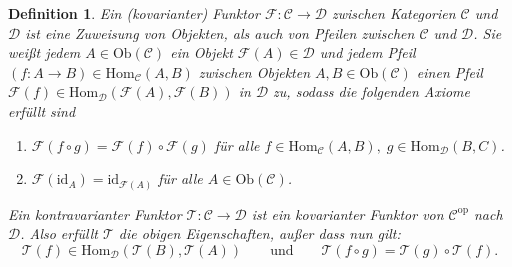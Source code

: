 \documentclass[a4paper, 11pt]{scrartcl}
\newcommand{\Hom}{\text{Hom}}
\newcommand{\id}{\text{id}}
\newcommand{\Ob}{\text{Ob}}
\theoremstyle{basicstyle}
\newtheorem{definition}{Definition}[section]
\begin{document}
    \begin{definition}
        Ein \emph{(kovarianter) Funktor} \(\mathcal{F}: \mathcal{C} \to \mathcal{D}\) zwischen Kategorien \(\mathcal{C}\) und \(\mathcal{D}\) ist eine Zuweisung von Objekten, als auch von Pfeilen zwischen \(\mathcal{C}\) und \(\mathcal{D}\).
        Sie weißt jedem \(A \in \Ob(\mathcal{C})\) ein Objekt \(\mathcal{F}(A) \in \mathcal{D}\) und jedem Pfeil \((f: A \to B) \in \Hom_\mathcal{C}(A, B)\) zwischen Objekten \(A, B \in \Ob(\mathcal{C})\) einen Pfeil \(\mathcal{F}(f) \in \Hom_{\mathcal{D}}(\mathcal{F}(A), \mathcal{F}(B))\) in \(\mathcal{D}\) zu, sodass die folgenden Axiome erfüllt sind
        \begin{enumerate}
            \item \(\mathcal{F}(f \circ g) = \mathcal{F}(f) \circ \mathcal{F}(g)\) für alle \(f \in \Hom_{\mathcal{C}}(A, B), \; g \in \Hom_{\mathcal{D}}(B, C)\).
            \item \(\mathcal{F}(\id_A) = \id_{\mathcal{F}(A)}\) für alle \(A \in \Ob(\mathcal{C})\).
        \end{enumerate}
        Ein \emph{kontravarianter Funktor} \(\mathcal{T}: \mathcal{C} \to \mathcal{D}\) ist ein kovarianter Funktor von \(\mathcal{C}^{\text{op}}\) nach \(\mathcal{D}\).
        Also erfüllt \(\mathcal{T}\) die obigen Eigenschaften, außer dass nun gilt:
        \[\mathcal{T}(f) \in \Hom_{\mathcal{D}}(\mathcal{T}(B), \mathcal{T}(A)) \qquad\text{und}\qquad \mathcal{T}(f \circ g) = \mathcal{T}(g) \circ \mathcal{T}(f).\]
    \end{definition}
\end{document}
